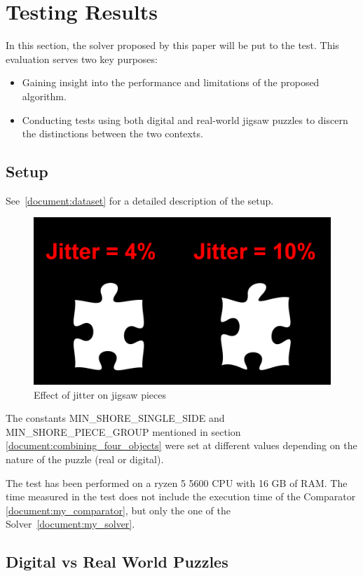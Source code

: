 \documentclass{article}
\begin{document}
\section{Testing Results}

In this section, the solver proposed by this paper will be put to the test.
This evaluation serves two key purposes:

\begin{itemize}
  \item Gaining insight into the performance and limitations of the proposed algorithm.
  \item Conducting tests using both digital and real-world jigsaw puzzles to discern the distinctions between the two contexts.
\end{itemize}

\subsection{Setup}
See~\cref{document:dataset} for a detailed
description of the setup.

\begin{figure}[H]
  \caption{Effect of jitter on jigsaw pieces}\label{fig:jiiter}
  \centering
  \includegraphics[height=0.3\textwidth]{pictures/jitter.png}
\end{figure}

The constants MIN\_SHORE\_SINGLE\_SIDE and MIN\_SHORE\_PIECE\_GROUP mentioned in section
\cref{document:combining_four_objects} were set at different values
depending on the nature of the puzzle (real or digital).

The test has been performed on a ryzen 5 5600 CPU with 16 GB of RAM.
The time measured in the test does not include the execution time of the Comparator
\cref{document:my_comparator}, but only the one of the Solver~\cref{document:my_solver}.

\subsection{Digital vs Real World Puzzles}
\end{document}
